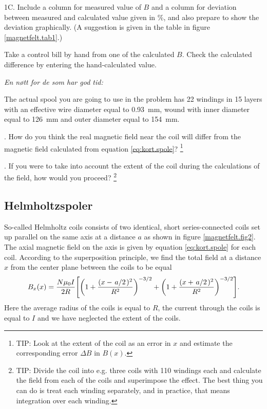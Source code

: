 \documentclass[../Elmag-labhefte-2020.tex]{subfiles}
\begin{document}
{\itsf 1C. Include a column for measured value of $B$ and a column for deviation between measured and calculated value given in \si{\percent}, and also prepare to show the deviation graphically.} (A suggestion is given in the table in figure \ref{magnetfelt.tab1}.)

Take a control bill by hand from one of the calculated $B$. Check the calculated difference by entering the hand-calculated value.

\vspace{4mm}

\emph{En nøtt for de som har god tid:}

The actual spool you are going to use in the problem has 22 windings in 15 layers with an effective wire diameter equal to \SI{0,93}{\mm}, wound with inner diameter equal to \SI{126}{\mm} and outer diameter equal to \SI{154}{\mm}.

{. How do you think the real magnetic field near the coil will differ from the magnetic field calculated from equation \eqref{eq:kort.spole}?}
\footnote{TIP: Look at the extent of the coil as an error in $x$ and estimate the corresponding error $\Delta B$ in $B(x)$.}

{. If you were to take into account the extent of the coil during the calculations of the field, how would you proceed?} \footnote{TIP: Divide the coil into e.g. three coils with 110 windings each and calculate the field from each of the coils and superimpose the effect. The best thing you can do is treat each winding separately, and in practice, that means integration over each winding.}

\subsection{Helmholtzspoler}

So-called Helmholtz coils
consists of two identical, short series-connected coils set up parallel on the same axis at a distance $a$ as shown in figure \ref{magnetfelt.fig2}. The axial magnetic field on the axis is given by equation \eqref{eq:kort.spole} for each coil. According to the superposition principle, we find the total field at a distance $x$ from the center plane between the coils to be equal
%
\begin{equation}
    B_x (x) 
        = \frac{N \mu_0 I}{2 R} \qty[\qty(1 + \frac{(x - \flatfrac{a}{2})^2}{R^2})^{-3/2} 
            + \qty(1 + \frac{(x + \flatfrac{a}{2})^2}{R^2})^{-3/2}].
    \label{eq:Helmholtz}
\end{equation}
%
Here the average radius of the coils is equal to $R$, the current through the coils is equal to $I$ and we have neglected the extent of the coils.
\end{document}
